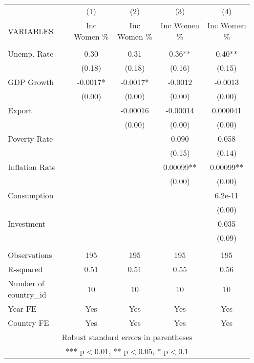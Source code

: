 \documentclass[]{article}
\begin{document}
\begin{tabular}{lcccc} \hline
 & (1) & (2) & (3) & (4) \\
VARIABLES & Inc Women \% & Inc Women \% & Inc Women \% & Inc Women \% \\ \hline
 &  &  &  &  \\
Unemp. Rate & 0.30 & 0.31 & 0.36** & 0.40** \\
 & (0.18) & (0.18) & (0.16) & (0.15) \\
GDP Growth & -0.0017* & -0.0017* & -0.0012 & -0.0013 \\
 & (0.00) & (0.00) & (0.00) & (0.00) \\
Export &  & -0.00016 & -0.00014 & 0.000041 \\
 &  & (0.00) & (0.00) & (0.00) \\
Poverty Rate &  &  & 0.090 & 0.058 \\
 &  &  & (0.15) & (0.14) \\
Inflation Rate &  &  & 0.00099** & 0.00099** \\
 &  &  & (0.00) & (0.00) \\
Consumption &  &  &  & 6.2e-11 \\
 &  &  &  & (0.00) \\
Investment &  &  &  & 0.035 \\
 &  &  &  & (0.09) \\
 &  &  &  &  \\
Observations & 195 & 195 & 195 & 195 \\
R-squared & 0.51 & 0.51 & 0.55 & 0.56 \\
Number of country\_id & 10 & 10 & 10 & 10 \\
Year FE & Yes & Yes & Yes & Yes \\
 Country FE & Yes & Yes & Yes & Yes \\ \hline
\multicolumn{5}{c}{ Robust standard errors in parentheses} \\
\multicolumn{5}{c}{ *** p$<$0.01, ** p$<$0.05, * p$<$0.1} \\
\end{tabular}
\end{document}
